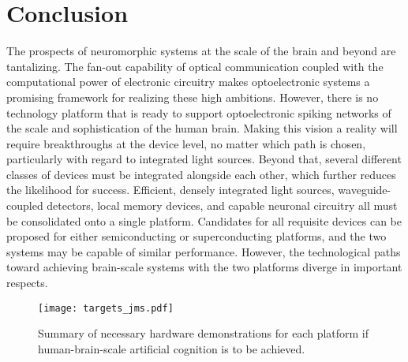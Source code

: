 \documentclass[twocolumn]{article}
\begin{document}
\section{\label{sec:conclusion}Conclusion}
The prospects of neuromorphic systems at the scale of the brain and beyond are tantalizing. The fan-out capability of optical communication coupled with the computational power of electronic circuitry makes optoelectronic systems a promising framework for realizing these high ambitions. However, there is no technology platform that is ready to support optoelectronic spiking networks of the scale and sophistication of the human brain. Making this vision a reality will require breakthroughs at the device level, no matter which path is chosen, particularly with regard to integrated light sources. Beyond that, several different classes of devices must be integrated alongside each other, which further reduces the likelihood for success. Efficient, densely integrated light sources, waveguide-coupled detectors, local memory devices, and capable neuronal circuitry all must be consolidated onto a single platform. Candidates for all requisite devices can be proposed for either semiconducting or superconducting platforms, and the two systems may be capable of similar performance. However, the technological paths toward achieving brain-scale systems with the two platforms diverge in important respects.


\begin{figure}[!h]
    \centering
    \texttt{[image: targets\_jms.pdf]}
    \caption{Summary of necessary hardware demonstrations for each platform if human-brain-scale artificial cognition is to be achieved.}
    \label{fig:targets}
\end{figure}
\end{document}
